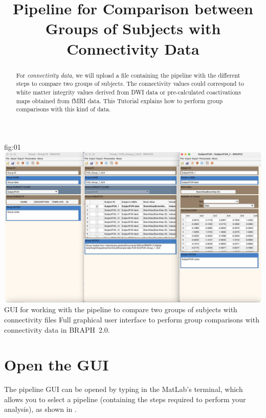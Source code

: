 \documentclass[justified]{tufte-handout}
\title{Pipeline for Comparison between Groups of Subjects with Connectivity Data}
\begin{document}
\maketitle

\begin{abstract}
\noindent
For \emph{connectivity data}, we will upload a file containing the pipeline with the different steps to compare two groups of subjects. The connectivity values could correspond to white matter integrity values derived from DWI data or pre-calculated coactivations maps obtained from fMRI data. This Tutorial explains how to perform group comparisons with this kind of data.
\end{abstract}

\tableofcontents

	{fig:01}
	{\includegraphics{fig01.jpg}}
	{GUI for working with the pipeline to compare two groups of subjects with connectivity files}
	{
	Full graphical user interface to perform group comparisons with connectivity data in BRAPH~2.0. 
	}

\clearpage
\section{Open the GUI}

The pipeline GUI can be opened by typing  in the MatLab's terminal, which allows you to select a pipeline (containing the steps required to perform your analysis), as shown in .
\end{document}

